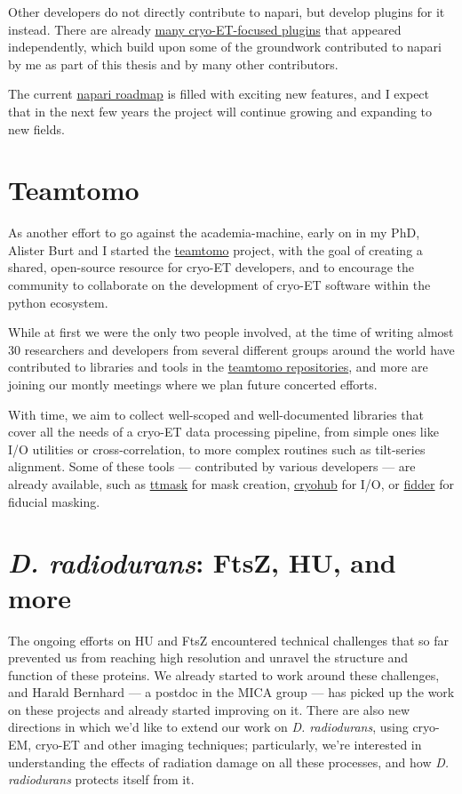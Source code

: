 Other developers do not directly contribute to napari, but develop plugins for it instead.
There are already \href{https://www.napari-hub.org/plugins?search=cryo+ET&sort=relevance&page=1}{many cryo-ET-focused plugins} that appeared independently, which build upon some of the groundwork contributed to napari by me as part of this thesis and by many other contributors.

The current \href{https://github.com/orgs/napari/projects/24/views/2?pane=info}{napari roadmap} is filled with exciting new features, and I expect that in the next few years the project will continue growing and expanding to new fields.


\section{Teamtomo}\label{teamtomo}

As another effort to go against the academia-machine, early on in my PhD, Alister Burt and I started the \href{https://teamtomo.org}{teamtomo} project, with the goal of creating a shared, open-source resource for cryo-ET developers, and to encourage the community to collaborate on the development of cryo-ET software within the python ecosystem.

While at first we were the only two people involved, at the time of writing almost 30 researchers and developers from several different groups around the world have contributed to libraries and tools in the \href{https://github.com/teamtomo}{teamtomo repositories}, and more are joining our montly meetings where we plan future concerted efforts.

With time, we aim to collect well-scoped and well-documented libraries that cover all the needs of a cryo-ET data processing pipeline, from simple ones like I/O utilities or cross-correlation, to more complex routines such as tilt-series alignment.
Some of these tools --- contributed by various developers --- are already available, such as \href{https://github.com/teamtomo/ttmask}{ttmask} for mask creation, \href{https://github.com/teamtomo/cryohub}{cryohub} for I/O, or \href{https://github.com/teamtomo/fidder}{fidder} for fiducial masking.


\section{\textit{D. radiodurans}: FtsZ, HU, and more}

The ongoing efforts on HU and FtsZ encountered technical challenges that so far prevented us from reaching high resolution and unravel the structure and function of these proteins.
We already started to work around these challenges, and Harald Bernhard --- a postdoc in the MICA group --- has picked up the work on these projects and already started improving on it.
There are also new directions in which we'd like to extend our work on \textit{D. radiodurans}, using cryo-EM, cryo-ET and other imaging techniques; particularly, we're interested in understanding the effects of radiation damage on all these processes, and how \textit{D. radiodurans} protects itself from it.

